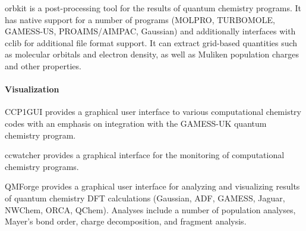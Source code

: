 orbkit \cite{hermann2016orbkit} is a post-processing tool for the results of quantum chemistry programs.  It has native support for a number of programs (MOLPRO, TURBOMOLE, GAMESS-US, PROAIMS/AIMPAC, Gaussian) and additionally interfaces with cclib for additional file format support.  It can extract grid-based quantities such as molecular orbitals and electron density, as well as Muliken population charges and other properties.


\paragraph{Visualization}
CCP1GUI provides a graphical user interface to various computational chemistry codes with an emphasis on integration with the GAMESS-UK quantum chemistry program.

ccwatcher provides a graphical interface for the monitoring of computational chemistry programs.

QMForge provides a graphical user interface for analyzing and visualizing results of quantum chemistry DFT calculations (Gaussian, ADF, GAMESS, Jaguar, NWChem, ORCA, QChem).  Analyses include a number of population analyses, Mayer's bond order, charge decomposition, and fragment analysis.
